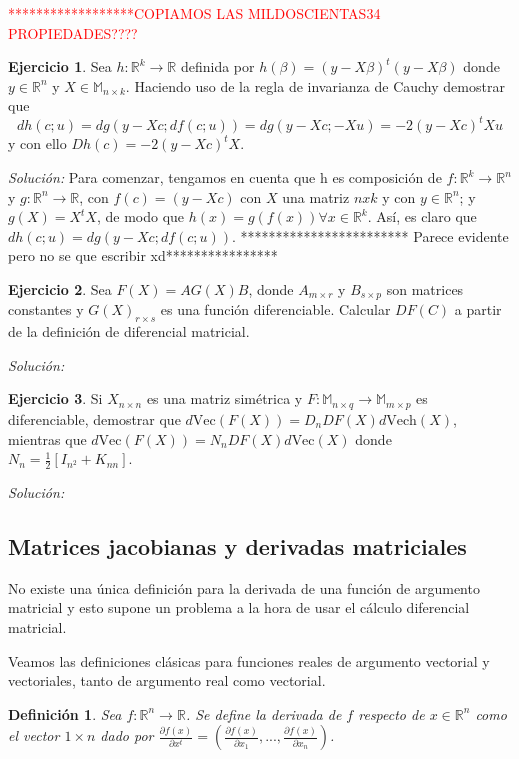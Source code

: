 \documentclass{article}
\theoremstyle{theorem-style}  %
\theoremstyle{definition}
\newtheorem{definition}{Definición}[section]
\theoremstyle{example-style}
\newtheorem{exercise}{Ejercicio}[section]
\begin{document}
\textcolor{red}{******************COPIAMOS LAS MILDOSCIENTAS34 PROPIEDADES????}

\begin{exercise}
	Sea $h: \mathbb{R}^k \rightarrow \mathbb{R}$ definida por $h(\beta) = (y-X\beta)^t(y-X\beta)$ donde $y \in \mathbb{R}^n$ y $X\in\mathbb{M}_{n\times k}.$ Haciendo uso de la regla de invarianza de Cauchy demostrar que
	$$dh(c;u) = dg(y-Xc;df(c;u)) = dg(y-Xc;-Xu)=-2(y-Xc)^tXu$$
	y con ello $Dh(c)=-2(y-Xc)^tX$.
\end{exercise}
\textit{Solución:}
	Para comenzar, tengamos en cuenta que h es composición de $f: \mathbb{R}^k \rightarrow \mathbb{R}^n$ y $g:\mathbb{R}^n \rightarrow \mathbb{R}$, con $f(c) = (y-Xc)$ con $X$ una matriz $nxk$ y con $y \in \mathbb{R}^n$; y $g(X) = X^tX$, de modo que $h(x)=g(f(x)) \forall x \in  \mathbb{R}^k$. Así, es claro que  $dh(c;u) = dg(y-Xc;df(c;u))$. ************************ Parece evidente pero no se que escribir xd****************
\begin{exercise}
	Sea $F(X)=AG(X)B$, donde $A_{m\times r}$ y $B_{s\times p}$ son matrices constantes y $G(X)_{r\times s}$ es una función diferenciable. Calcular $DF(C)$ a partir de la definición de diferencial matricial.
\end{exercise}
\textit{Solución:}

\begin{exercise}
	Si $X_{n\times n}$ es una matriz simétrica y $F: \mathbb{M}_{n\times q} \rightarrow \mathbb{M}_{m\times p}$ es diferenciable, demostrar que $d\text{Vec}(F(X)) = D_nDF(X)d\text{Vech}(X)$, mientras que $d\text{Vec}(F(X)) = N_nDF(X)d\text{Vec}(X)$ donde $N_n = \frac{1}{2}[I_{n^2}+K_{nn}]$.
\end{exercise}
\textit{Solución:}


\subsection{Matrices jacobianas y derivadas matriciales}

No existe una única definición para la derivada de una función de argumento matricial y esto supone un problema a la hora de usar el cálculo diferencial matricial.

Veamos las definiciones clásicas para funciones reales de argumento vectorial y vectoriales, tanto de argumento real como vectorial.

\begin{definition}
	\textit{Sea $f:\mathbb{R}^n\rightarrow \mathbb{R}$. Se define la derivada de $f$ respecto de $x\in \mathbb{R}^n$ como el vector $1\times n$ dado por $\displaystyle \frac{\partial f(x)}{\partial x^t} = \displaystyle \left( \frac{\partial f(x)}{\partial x_1},..., \frac{\partial f(x)}{\partial x_n} \right)$.}
\end{definition}
\end{document}
